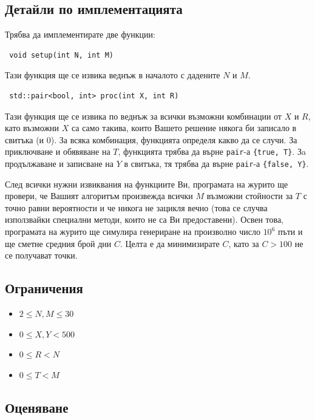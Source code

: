 \documentclass[12pt]{article}
\begin{document}
\subsection{Детайли по имплементацията}

Трябва да имплементирате две функции:

\begin{lstlisting}
 void setup(int N, int M)
\end{lstlisting}

Тази функция ще се извика веднъж в началото с дадените $N$ и $M$.

\begin{lstlisting}
 std::pair<bool, int> proc(int X, int R)
\end{lstlisting}

Тази функция ще се извика по веднъж за всички възможни комбинации от $X$ и $R$, като възможни $X$ са само такива, които Вашето решение някога би записало в свитъка (и $0$). За всяка комбинация, функцията определя какво да се случи. За приключване и обявяване на $T$, функцията трябва да върне \verb|pair|-а \verb|{true, T}|. Зa продължаване и записване на $Y$ в свитъка, тя трябва да върне  \verb|pair|-а \verb|{false, Y}|.

\vspace{-0.1em}
След всички нужни извиквания на функциите Ви, програмата на журито ще провери, че Вашият алгоритъм произвежда всички $M$ възможни стойности за $T$ с точно равни вероятности и че никога не зацикля вечно (това се случва използвайки специални методи, които не са Ви предоставени). Освен това, програмата на журито ще симулира генериране на произволно число $10^6$ пъти и ще сметне средния брой дни $C$. Целта е да минимизирате $C$, като за $C > 100$ не се получават точки. 

\subsection{Ограничения}

\vspace{0.1em}

\begin{itemize}
\item $2 \leq N, M \leq 30$
\item $0 \leq X, Y < 500$
\item $0 \leq R < N$
\item $0 \leq T < M$
\end{itemize}

\subsection{Оценяване}
\end{document}
